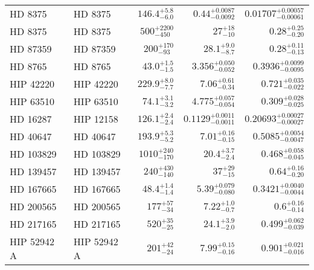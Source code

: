 \begin{longtable*}{llrrr}
HD 8375 & HD 8375 & $146.4^{+5.8}_{-6.0}$ & $0.44^{+0.0087}_{-0.0092}$ & $0.01707^{+0.00057}_{-0.00061}$ \\
HD 8375 & HD 8375 & $500^{+2200}_{-450}$ & $27^{+18}_{-10}$ & $0.28^{+0.25}_{-0.20}$ \\
HD 87359 & HD 87359 & $200^{+170}_{-93}$ & $28.1^{+9.0}_{-8.7}$ & $0.28^{+0.11}_{-0.13}$ \\
HD 8765 & HD 8765 & $43.0^{+1.5}_{-1.5}$ & $3.356^{+0.050}_{-0.052}$ & $0.3936^{+0.0099}_{-0.0095}$ \\
HIP 42220 & HIP 42220 & $229.9^{+8.0}_{-7.7}$ & $7.06^{+0.61}_{-0.34}$ & $0.721^{+0.035}_{-0.022}$ \\
HIP 63510 & HIP 63510 & $74.1^{+3.1}_{-3.2}$ & $4.775^{+0.057}_{-0.054}$ & $0.309^{+0.028}_{-0.025}$ \\
HD 16287 & HIP 12158 & $126.1^{+2.4}_{-2.4}$ & $0.1129^{+0.0011}_{-0.0011}$ & $0.20693^{+0.00027}_{-0.00027}$ \\
HD 40647 & HD 40647 & $193.9^{+5.3}_{-5.2}$ & $7.01^{+0.16}_{-0.15}$ & $0.5085^{+0.0054}_{-0.0047}$ \\
HD 103829 & HD 103829 & $1010^{+240}_{-170}$ & $20.4^{+3.7}_{-2.4}$ & $0.468^{+0.058}_{-0.045}$ \\
HD 139457 & HD 139457 & $240^{+430}_{-140}$ & $37^{+29}_{-15}$ & $0.64^{+0.16}_{-0.20}$ \\
HD 167665 & HD 167665 & $48.4^{+1.4}_{-1.4}$ & $5.39^{+0.079}_{-0.080}$ & $0.3421^{+0.0040}_{-0.0044}$ \\
HD 200565 & HD 200565 & $177^{+57}_{-34}$ & $7.22^{+1.0}_{-0.7}$ & $0.6^{+0.16}_{-0.14}$ \\
HD 217165 & HD 217165 & $520^{+35}_{-25}$ & $24.1^{+3.9}_{-2.0}$ & $0.499^{+0.062}_{-0.039}$ \\
HIP 52942 A & HIP 52942 A & $201^{+42}_{-24}$ & $7.99^{+0.15}_{-0.16}$ & $0.901^{+0.021}_{-0.016}$ \\
\bottomrule
\end{longtable*}
